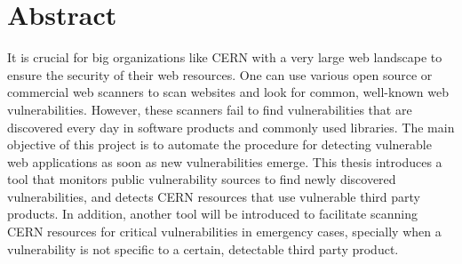\chapter*{Abstract}

It is crucial for big organizations like CERN with a very large web landscape to ensure the security of their web resources. One can use various open source or commercial web scanners to scan websites and look for common, well-known web vulnerabilities. However, these scanners fail to find vulnerabilities that are discovered every day in software products and commonly used libraries. The main objective of this project is to automate the procedure for detecting vulnerable web applications as soon as new vulnerabilities emerge. This thesis introduces a tool that monitors public vulnerability sources to find newly discovered vulnerabilities, and detects CERN resources that use vulnerable third party products. In addition, another tool will be introduced to facilitate scanning CERN resources for critical vulnerabilities in emergency cases, specially when a vulnerability is not specific to a certain, detectable third party product.